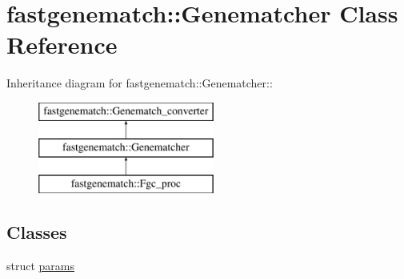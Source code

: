 \hypertarget{classfastgenematch_1_1Genematcher}{
\section{fastgenematch::Genematcher Class Reference}
\label{classfastgenematch_1_1Genematcher}
}
Inheritance diagram for fastgenematch::Genematcher::\begin{figure}[H]
\begin{center}
\leavevmode
\includegraphics[height=3cm]{classfastgenematch_1_1Genematcher}
\end{center}
\end{figure}
\subsection*{Classes}
\begin{DoxyCompactItemize}
\item 
struct \hyperlink{structfastgenematch_1_1Genematcher_1_1params}{params}
\end{DoxyCompactItemize}
